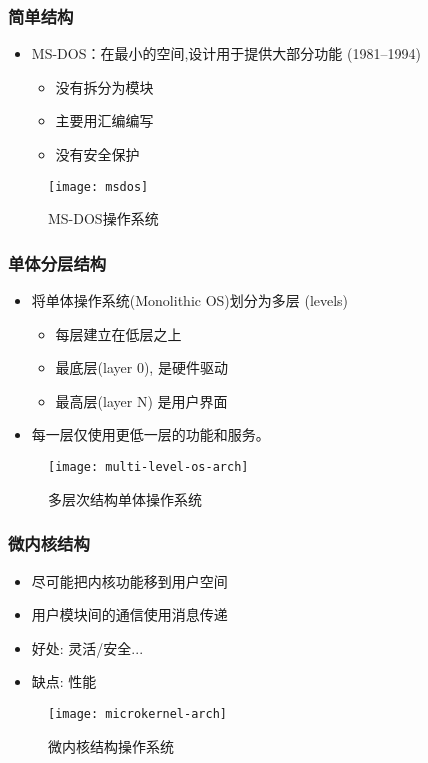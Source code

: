 \begin{frame}

\frametitle{简单结构}

\begin{itemize}
\item MS-DOS：在最小的空间,设计用于提供大部分功能 (1981--1994)
	\begin{itemize}
	\item 没有拆分为模块
	\item 主要用汇编编写
	\item 没有安全保护
	\end{itemize}
\end{itemize}
	\begin{figure}
	\centering
	\texttt{[image: msdos]}
	\caption{MS-DOS操作系统}
\end{figure}

\end{frame}



\begin{frame}
	
	\frametitle{单体分层结构}
	
	\begin{itemize}
		\item 将单体操作系统(Monolithic OS)划分为多层 (levels)
		\begin{itemize}
			\item 每层建立在低层之上
			\item 最底层(layer 0), 是硬件驱动
			\item 最高层(layer N) 是用户界面
		\end{itemize}
	\item 每一层仅使用更低一层的功能和服务。
	\end{itemize}
	\begin{figure}
		\centering
		\texttt{[image: multi-level-os-arch]}
		\caption{多层次结构单体操作系统}
	\end{figure}
	
\end{frame}



\begin{frame}
	
	\frametitle{微内核结构}
	
	\begin{itemize}
		\item 尽可能把内核功能移到用户空间
		\item 用户模块间的通信使用消息传递
		\item 好处: 灵活/安全...
		\item 缺点: 性能
	\end{itemize}
	\begin{figure}
		\centering
		\texttt{[image: microkernel-arch]}
		\caption{微内核结构操作系统}
	\end{figure}
	
\end{frame}




